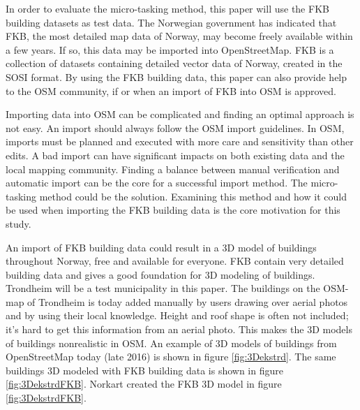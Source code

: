 \documentclass[12pt, a4paper]{report}   	%
\begin{document}
In order to evaluate the micro-tasking method, this paper will use the FKB building datasets as test data. %
The Norwegian government has indicated that FKB, the most detailed map data of Norway, may become freely available within a few years. If so, this data may be imported into OpenStreetMap. FKB is a collection of datasets containing detailed vector data of Norway, created in the SOSI format. By using the FKB building data, this paper can also provide help to the OSM community, if or when an import of FKB into OSM is approved. 

Importing data into OSM can be complicated and finding an optimal approach is not easy. An import should always follow the OSM import guidelines. In OSM, imports must be planned and executed with more care and sensitivity than other edits. A bad import can have significant impacts on both existing data and the local mapping community. Finding a balance between manual verification and automatic import can be the core for a successful import method. The micro-tasking method could be the solution. Examining this method and how it could be used when importing the FKB building data is the core motivation for this study. 

An import of FKB building data could result in a 3D model of buildings throughout Norway, free and available for everyone. FKB contain very detailed building data and gives a good foundation for 3D modeling of buildings. Trondheim will be a test municipality in this paper. The buildings on the OSM-map of Trondheim is today added manually by users drawing over aerial photos and by using their local knowledge. Height and roof shape is often not included; it's hard to get this information from an aerial photo. This makes the 3D models of buildings nonrealistic in OSM. An example of 3D models of buildings from OpenStreetMap today (late 2016) is shown in figure \ref{fig:3Dekstrd}. The same buildings 3D modeled with FKB building data is shown in figure \ref{fig:3DekstrdFKB}. Norkart created the FKB 3D model in figure \ref{fig:3DekstrdFKB}. 
\end{document}
